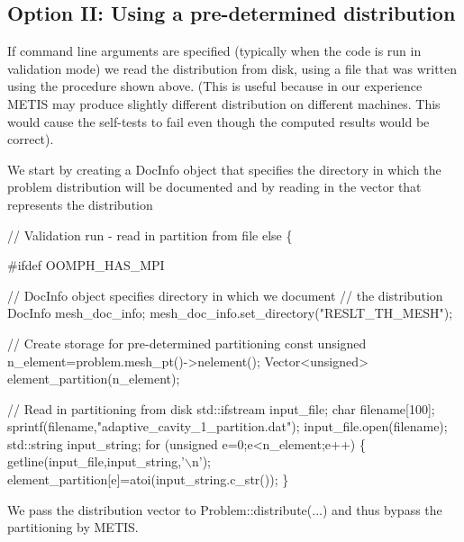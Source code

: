 \hypertarget{index_from_disk}{}\subsection{Option I\+I\+: Using a pre-\/determined distribution}\label{index_from_disk}
If command line arguments are specified (typically when the code is run in validation mode) we read the distribution from disk, using a file that was written using the procedure shown above. (This is useful because in our experience {\ttfamily M\+E\+T\+IS} may produce slightly different distribution on different machines. This would cause the self-\/tests to fail even though the computed results would be correct).

We start by creating a {\ttfamily Doc\+Info} object that specifies the directory in which the problem distribution will be documented and by reading in the vector that represents the distribution

 
\begin{DoxyCodeInclude}
  \textcolor{comment}{// Validation run - read in partition from file}
  \textcolor{keywordflow}{else} 
   \{

\textcolor{preprocessor}{#ifdef OOMPH\_HAS\_MPI}

    \textcolor{comment}{// DocInfo object specifies directory in which we document}
    \textcolor{comment}{// the distribution}
    DocInfo mesh\_doc\_info;
    mesh\_doc\_info.set\_directory(\textcolor{stringliteral}{"RESLT\_TH\_MESH"});

    \textcolor{comment}{// Create storage for pre-determined partitioning}
    \textcolor{keyword}{const} \textcolor{keywordtype}{unsigned} n\_element=problem.mesh\_pt()->nelement();
    Vector<unsigned> element\_partition(n\_element);

    \textcolor{comment}{// Read in partitioning from disk}
    std::ifstream input\_file;
    \textcolor{keywordtype}{char} filename[100];
    sprintf(filename,\textcolor{stringliteral}{"adaptive\_cavity\_1\_partition.dat"});
    input\_file.open(filename);
    std::string input\_string;
    \textcolor{keywordflow}{for} (\textcolor{keywordtype}{unsigned} e=0;e<n\_element;e++)
     \{
      getline(input\_file,input\_string,\textcolor{charliteral}{'\(\backslash\)n'});
      element\_partition[e]=atoi(input\_string.c\_str());
     \}

\end{DoxyCodeInclude}


We pass the distribution vector to {\ttfamily Problem\+::distribute}(...) and thus bypass the partitioning by {\ttfamily M\+E\+T\+IS}.


